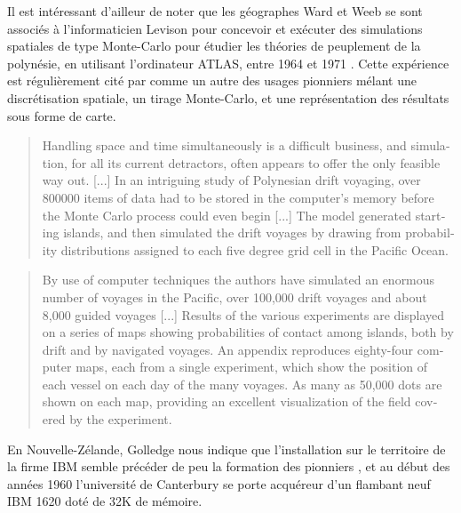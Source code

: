 Il est intéressant d'ailleur de noter que les géographes Ward et Weeb se sont associés à l'informaticien Levison pour concevoir et exécuter des simulations spatiales de type Monte-Carlo pour étudier les théories de peuplement de la polynésie, en utilisant l'ordinateur ATLAS, entre 1964 et 1971 \autocites{Montillier1974, Ward1973}. Cette expérience est régulièrement cité par \textcite{Gould1970, Gould1975} comme un autre des usages pionniers mélant une discrétisation spatiale, un tirage Monte-Carlo, et une représentation des résultats sous forme de carte.

\foreignblockquote{english}[\cite{Gould1970}]{Handling space and time simultaneously is a difficult business, and simulation, for all its current detractors, often appears to offer the only feasible way out. [...] In an intriguing study of Polynesian drift voyaging, over 800000 items of data had to be stored in the computer’s memory before the Monte Carlo process could even begin [...] The model generated starting islands, and then simulated the drift voyages by drawing from probability distributions assigned to each five degree grid cell in the Pacific Ocean.}

\foreignblockquote{english}[\cite{Doran1974}]{ By use of computer techniques the authors have simulated an enormous number of voyages in the Pacific, over 100,000 drift voyages and about 8,000 guided voyages [...] Results of the various experiments are displayed on a series of maps showing probabilities of contact among islands, both by drift and by navigated voyages. An appendix reproduces eighty-four computer maps, each from a single experiment, which show the position of each vessel on each day of the many voyages. As many as 50,000 dots are shown on each map, providing an excellent visualization of the field covered by the experiment.}


En Nouvelle-Zélande, Golledge nous indique que l'installation sur le territoire de la firme IBM semble précéder de peu la formation des pionniers \autocite[94]{Bailly2000}, et au début des années 1960 l'université de Canterbury se porte acquéreur d'un flambant neuf IBM 1620 doté de 32K de mémoire.


